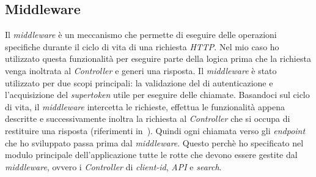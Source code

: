 \subsection{Middleware}\label{subsec:middleware}
Il \textit{middleware} è un meccanismo che permette di eseguire delle operazioni specifiche durante il ciclo di vita di una richiesta \textit{HTTP}. 
Nel mio caso ho utilizzato questa funzionalità per eseguire parte della logica prima che la richiesta venga inoltrata al \textit{Controller} e generi una risposta.
Il \textit{middleware} è stato utilizzato per due scopi principali: la validazione del  di autenticazione e l'acquisizione del \textit{supertoken} utile per eseguire delle chiamate.
Basandoci sul ciclo di vita, il \textit{middleware} intercetta le richieste, effettua le funzionalità appena descritte e successivamente inoltra la richiesta al \textit{Controller} che si occupa di restituire una risposta (riferimenti in~\cite{site:middleware}).
Quindi ogni chiamata verso gli \textit{endpoint} che ho sviluppato passa prima dal \textit{middleware}. Questo perchè ho specificato
nel modulo principale dell'applicazione tutte le rotte che devono essere gestite dal \textit{middleware}, ovvero i \textit{Controller} di \textit{client-id}, \textit{API} e \textit{search}.

